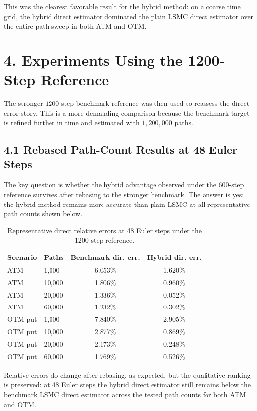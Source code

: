 \documentclass[11pt,a4paper]{article}
\begin{document}
This was the clearest favorable result for the hybrid method: on a coarse time grid, the hybrid direct estimator dominated the plain LSMC direct estimator over the entire path sweep in both ATM and OTM.

\section*{4. Experiments Using the 1200-Step Reference}

The stronger \(1200\)-step benchmark reference was then used to reassess the direct-error story. This is a more demanding comparison because the benchmark target is refined further in time and estimated with \(1{,}200{,}000\) paths.

\subsection*{4.1 Rebased Path-Count Results at 48 Euler Steps}

The key question is whether the hybrid advantage observed under the \(600\)-step reference survives after rebasing to the stronger benchmark. The answer is yes: the hybrid method remains more accurate than plain LSMC at all representative path counts shown below.

\begin{table}[h!]
\centering
\caption{Representative direct relative errors at 48 Euler steps under the 1200-step reference.}
\begin{tabular}{llcc}
\toprule
Scenario & Paths & Benchmark dir. err. & Hybrid dir. err. \\
\midrule
ATM & 1,000 & 6.053\% & 1.620\% \\
ATM & 10,000 & 1.806\% & 0.960\% \\
ATM & 20,000 & 1.336\% & 0.052\% \\
ATM & 60,000 & 1.232\% & 0.302\% \\
\midrule
OTM put & 1,000 & 7.840\% & 2.905\% \\
OTM put & 10,000 & 2.877\% & 0.869\% \\
OTM put & 20,000 & 2.173\% & 0.248\% \\
OTM put & 60,000 & 1.769\% & 0.526\% \\
\bottomrule
\end{tabular}
\end{table}

Relative errors do change after rebasing, as expected, but the qualitative ranking is preserved: at \(48\) Euler steps the hybrid direct estimator still remains below the benchmark LSMC direct estimator across the tested path counts for both ATM and OTM.
\end{document}
